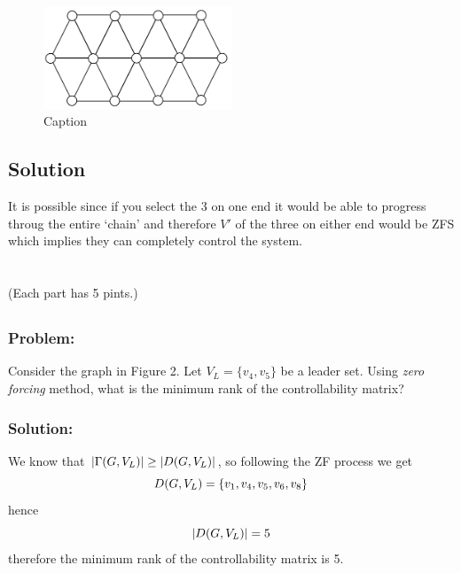 \documentclass[]{article}
\numberwithin{equation}{section}
\begin{document}
\begin{figure}[h]
    \centering
    \includegraphics[width=0.5\textwidth]{figs/image1.png}
    \caption{Caption}
\end{figure}

\subsection*{Solution}
It is possible since if you select the 3 on one end it would be able to progress throug the entire `chain' and therefore $V'$ of the three on either end would be ZFS which implies they can completely control the system.

\newpage
\section{}
(Each part has 5 pints.)

\subsection{}
\subsubsection*{Problem:}
Consider the graph in Figure 2. 
Let $V_L = \{v_4,v_5\}$ be a leader set. 
Using \emph{zero forcing} method, what is the minimum rank of the controllability matrix?
\subsubsection*{Solution:}
We know that $\abs{\Gamma(G,V_L)} \geq \abs{D(G,V_L)}$, so following the ZF process we get \[
    D(G,V_L) = \qty{
        v_1, v_4, v_5, v_6, v_8
    }
\] hence \[
    \abs{D(G,V_L)} = 5
\] therefore the minimum rank of the controllability matrix is 5.

\subsection{}
\end{document}
